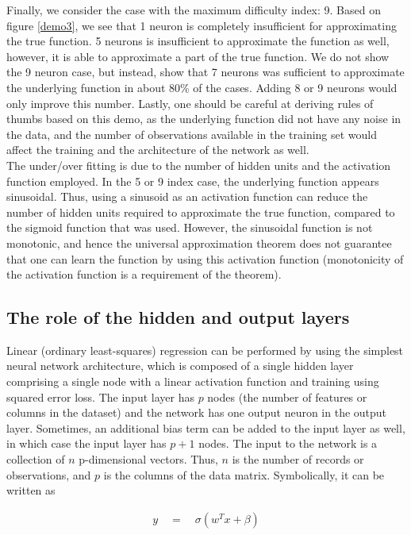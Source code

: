 \documentclass[paper=a4, fontsize=11pt]{scrartcl} %
\numberwithin{equation}{section} %
\begin{document}
Finally, we consider the case with the maximum difficulty index: 9. Based on figure \ref{demo3}, we see that 1 neuron is completely insufficient for approximating the true function. 5 neurons is insufficient to approximate the function as well, however, it is able to approximate a part of the true function. We do not show the 9 neuron case, but instead, show that 7 neurons was sufficient to approximate the underlying function in about 80\% of the cases. Adding 8 or 9 neurons would only improve this number. Lastly, one should be careful at deriving rules of thumbs based on this demo, as the underlying function did not have any noise in the data, and the number of observations available in the training set would affect the training and the architecture of the network as well.\\

The under/over fitting is due to the number of hidden units and the activation function employed. In the 5 or 9 index case, the underlying function appears sinusoidal. Thus, using a sinusoid as an activation function can reduce the number of hidden units required to approximate the true function, compared to the sigmoid function that was used. However, the sinusoidal function is not monotonic, and hence the universal approximation theorem does not guarantee that one can learn the function by using this activation function (monotonicity of the activation function is a requirement of the theorem).

\subsection{The role of the hidden and output layers}

Linear (ordinary least-squares) regression can be performed by using the simplest neural network architecture, which is composed of a single hidden layer comprising a single node with a linear activation function and training using squared error loss. The input layer has $p$ nodes (the number of features or columns in the dataset) and the network has one output neuron in the output layer. Sometimes, an additional bias term can be added to the input layer as well, in which case the input layer has $p+1$ nodes. The input to the network is a collection of $n$ p-dimensional vectors. Thus, $n$ is the number of records or observations, and $p$ is the columns of the data matrix. Symbolically, it can be written as

\begin{align}
y \quad = \quad \sigma(w^Tx+\beta)
\end{align}
\end{document}
